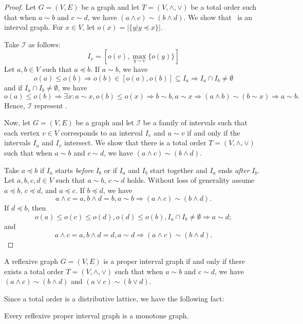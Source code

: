 \begin{proof}
Let \(G=(V,E)\) be a graph and let \(T=(V,\wedge,\vee)\) be a total order such that
when \(a\sim b\) and \(c \sim d\), we have \((a \wedge c) \sim (b \wedge d)\)\@.
We show that \mG\ is an interval graph. For \(x\in V\), let \(o(x) = |\{y| y\preceq x\}|\)\@.

Take \(\mathcal{I}\) as follows:
\[I_v = [o(v), \max_{y\sim v}\{o(y)\}]\]
Let \(a, b\in V\) such that \(a \preceq b\)\@. If \(a\sim b\), we have
\[o(a) \le o(b) \Rightarrow o(b) \in [o(a), o(b)] \subseteq I_a \Rightarrow I_a \cap I_b \neq \emptyset\]
and if \(I_a \cap I_b \neq \emptyset\), we have
\[o(a) \le o(b) \Rightarrow \exists x: a \sim x, o(b) \le o(x) \Rightarrow b\sim b, a\sim x \Rightarrow (a \wedge b) \sim (b \sim x) \Rightarrow a \sim b.\]
Hence, \(\mathcal{I}\) represent \mG\@.

Now, let \(G=(V,E)\) be a graph and let \(\mathcal{I}\) be a family of intervals such that
each vertex \(v \in V\) corresponds to an interval \(I_v\) and \(u \sim v\)
if and only if the intervals \(I_u\) and \(I_v\) intersect. We show that there is a
total order \(T=(V,\wedge,\vee)\) such that
when \(a\sim b\) and \(c \sim d\), we have \((a \wedge c) \sim (b \wedge d)\)\@.

Take \(a\preceq b\) if \(I_a\) starts \emph{before} \(I_b\) or if \(I_a\) and \(I_b\)
start together and \(I_a\) ends \emph{after} \(I_b\)\@. 
Let \(a,b,c,d \in V\) such that \(a \sim b\), \(c \sim d\) holds.
Without loss of generality assume \(a \preceq b\), \(c \preceq d\), and \(a \preceq c\)\@. 
If \(b \preceq d\), we have
\[a \wedge c = a, b \wedge d = b, a \sim b \Rightarrow  (a \wedge c) \sim (b \wedge d).\]
If \(d \preceq b\), then 
\[o(a) \le o(c) \le o(d), o(d) \le o(b), I_a \cap I_b \neq \emptyset \Rightarrow a\sim d;\]
and 
\[a \wedge c = a, b \wedge d = d, a\sim d \Rightarrow (a \wedge c) \sim (b \wedge d).\]

\end{proof}

\begin{theorem}\label{thm:minmax}
A reflexive graph \(G=(V,E)\) is a proper interval graph if and only if there exists
a total order \(T=(V,\wedge,\vee)\) such that
when \(a\sim b\) and \(c \sim d\), we have \((a \wedge c) \sim (b \wedge d)\) and \((a \vee c) \sim (b \vee d)\)\@.
\end{theorem}

Since a total order is a distributive lattice, we have the following fact:
\begin{cor} \label{cor:pintmon}
Every reflexive proper interval graph is a monotone graph.
\end{cor}

